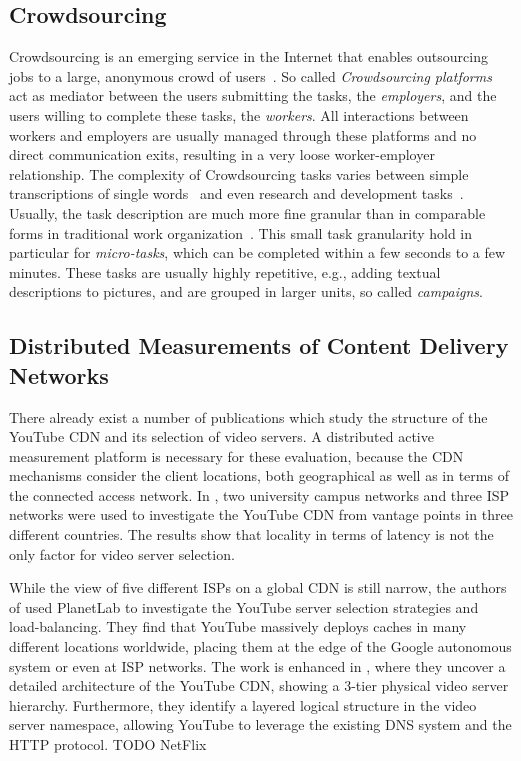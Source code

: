 \subsection{Crowdsourcing}
Crowdsourcing is an emerging service in the Internet that enables outsourcing jobs to a large, anonymous crowd of users~\cite{articles2013-113}.
So called \emph{Crowdsourcing platforms} act as mediator between the users submitting the tasks, the \emph{employers}, and the users willing to complete these tasks, the \emph{workers}.
All interactions between workers and employers are usually managed through these platforms and no direct communication exits, resulting in a very loose worker-employer relationship.
The complexity of Crowdsourcing tasks varies between simple transcriptions of single words~\cite{vonAhn2008} and even research and development tasks~\cite{innocentive}.
Usually, the task description are much more fine granular than in comparable forms in traditional work organization~\cite{conf2011-417}.
This small task granularity hold in particular for \emph{micro-tasks}, which can be completed within a few seconds to a few minutes.
These tasks are usually highly repetitive, e.g., adding textual descriptions to pictures, and are grouped in larger units, so called \emph{campaigns}.

\subsection{Distributed Measurements of Content Delivery Networks}
There already exist a number of publications which study the structure of the YouTube CDN and its selection of video servers.
A distributed active measurement platform is necessary for these evaluation, because the CDN mechanisms consider the client locations, both geographical as well as in terms of the connected access network.
In \cite{torres2011dissecting}, two university campus networks and three ISP networks were used to investigate the YouTube CDN from vantage points in three different countries.
The results show that locality in terms of latency is not the only factor for video server selection.

While the view of five different ISPs on a global CDN is still narrow, the authors of \cite{adhikari2011you} used PlanetLab to investigate the YouTube server selection strategies and load-balancing.
They find that YouTube massively deploys caches in many different locations worldwide, placing them at the edge of the Google autonomous system or even at ISP networks.
The work is enhanced in \cite{adhikari2012vivisecting}, where they uncover a detailed architecture of the YouTube CDN, showing a 3-tier physical video server hierarchy.
Furthermore, they identify a layered logical structure in the video server namespace, allowing YouTube to leverage the existing DNS system and the HTTP protocol.
TODO \cite{bottger2016open} NetFlix


